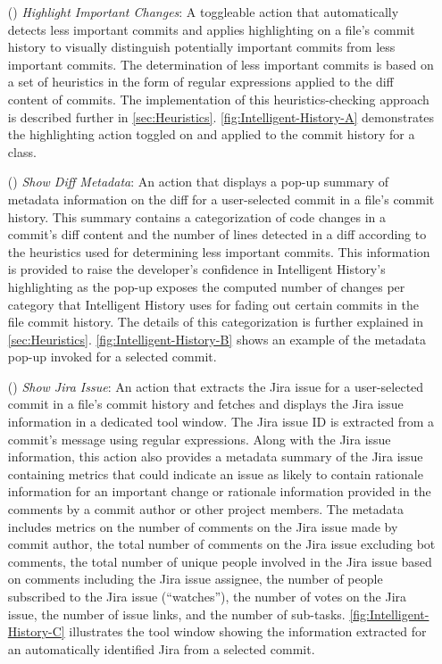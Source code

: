 \begin{itemize}
    \item[(\feature{1})] \textit{Highlight Important Changes}: 
        A toggleable action that automatically detects less important commits and applies highlighting on a file's commit history to visually distinguish potentially important commits from less important commits. 
        The determination of less important commits is based on a set of heuristics in the form of regular expressions applied to the diff content of commits. 
        The implementation of this heuristics-checking approach is described further in \autoref{sec:Heuristics}. 
        \autoref{fig:Intelligent-History-A} demonstrates the highlighting action toggled on and applied to the commit history for a class.
    \item[(\feature{2})] \textit{Show Diff Metadata}: 
        An action that displays a pop-up summary of metadata information on the diff for a user-selected commit in a file's commit history. 
        This summary contains a categorization of code changes in a commit's diff content and the number of lines detected in a diff according to the heuristics used for determining less important commits. 
        This information is provided to raise the developer's confidence in Intelligent History's highlighting as the pop-up exposes the computed number of changes per category that Intelligent History uses for fading out certain commits in the file commit history. 
        The details of this categorization is further explained in \autoref{sec:Heuristics}. \autoref{fig:Intelligent-History-B} shows an example of the metadata pop-up invoked for a selected commit.
    \item[(\feature{3})] \textit{Show Jira Issue}: 
        An action that extracts the Jira issue  for a user-selected commit in a file's commit history and fetches and displays the Jira issue information in a dedicated tool window. 
        The Jira issue ID is extracted from a commit's message using regular expressions. Along with the Jira issue information, 
        this action also provides a metadata summary of the Jira issue containing metrics that could indicate an issue as likely to contain rationale information for an
        important change or rationale information provided in the comments by a commit author or other project members. 
        The metadata includes metrics on the number of comments on the Jira issue made by commit author, 
        the total number of comments on the Jira issue excluding bot comments, 
        the total number of unique people involved in the Jira issue based on comments including the Jira issue assignee, 
        the number of people subscribed to the Jira issue (``watches''), the number of votes on the Jira issue, the number of issue links, 
        and the number of sub-tasks. \autoref{fig:Intelligent-History-C} illustrates the tool window showing the information extracted for an automatically identified Jira  from a selected commit.
\end{itemize}

